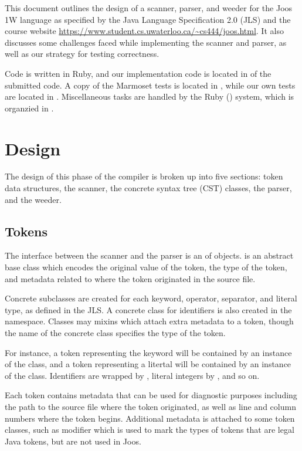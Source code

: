 \documentclass[pdftex,11pt,a4paper]{article}
\begin{document}

This document outlines the design of a scanner, parser, and weeder for
the Joos 1W language as specified by the Java Language Specification
2.0 (JLS) and the course website
\url{https://www.student.cs.uwaterloo.ca/~cs444/joos.html}. It also
discusses some challenges faced while implementing the scanner and
parser, as well as our strategy for testing correctness.

Code is written in Ruby, and our implementation code is located in
 of the submitted code. A copy of the Marmoset tests is
located in , while our own tests are located in
. Miscellaneous tasks are handled by the Ruby 
() system, which is organzied in .


\section{Design}

The design of this phase of the compiler is broken up into five
sections: token data structures, the scanner, the concrete syntax tree
(CST) classes, the parser, and the weeder.

\subsection{Tokens}

The interface between the scanner and the parser is an  of
 objects.  is an abstract base class
which encodes the original value of the token, the type of the token,
and metadata related to where the token originated in the source file.

Concrete subclasses are created for each keyword, operator, separator,
and literal type, as defined in the JLS. A concrete class for
identifiers is also created in the 
namespace. Classes may  mixins which attach extra
metadata to a token, though the name of the concrete class specifies
the type of the token.

For instance, a token representing the keyword  will
be contained by an instance of the  class, and
a token representing a litertal  will be contained by an
instance of the  class. Identifiers are wrapped
by , literal integers by
, and so on.

Each token contains metadata that can be used for diagnostic purposes
including the path to the source file where the token originated, as
well as line and column numbers where the token begins. Additional
metadata is attached to some token classes, such as 
modifier which is used to mark the types of tokens that are legal Java
tokens, but are not used in Joos.
\end{document}
